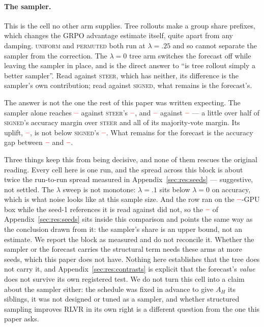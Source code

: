 \documentclass[11pt]{article}
\newcommand{\AH}{A_{H}}
\providecommand{\PENDING}{\textcolor{red}{\textbf{--}}}
\newcommand{\num}[1]{\ifcsname #1\endcsname\csname #1\endcsname\else\PENDING\fi}
\begin{document}
\paragraph{The sampler.} This is the cell no other arm supplies. Tree rollouts make a
group share prefixes, which changes the GRPO advantage estimate itself, quite apart
from any damping. \textsc{uniform} and \textsc{permuted} both run at $\lambda = .25$
and so cannot separate the sampler from the correction. The $\lambda = 0$ tree arm
switches the forecast off while leaving the sampler in place, and is the direct
answer to ``is tree rollout simply a better sampler''. Read against \textsc{steer},
which has neither, its difference is the sampler's own contribution; read against
\textsc{signed}, what remains is the forecast's.

The answer is not the one the rest of this paper was written expecting. The sampler
alone reaches $\num{Rlamzeroacc}$ against \textsc{steer}'s $\num{Rsteeracc}$, and
$\num{Rlamzeromaj}$ against $\num{Rsteermaj}$ --- a little over half of \textsc{signed}'s
accuracy margin over \textsc{steer} and all of its majority-vote margin. Its uplift, $\num{Rlamzerouplift}$, is not below \textsc{signed}'s
$\num{Rsigneduplift}$. What remains for the forecast is the accuracy gap between
$\num{Rlamzeroacc}$ and $\num{Rsignedacc}$.

Three things keep this from being decisive, and none of them rescues the original
reading. Every cell here is one run, and the spread across this block is about twice
the run-to-run spread measured in Appendix~\ref{sec:res:seeds} --- suggestive, not
settled. The $\lambda$ sweep is not monotone: $\lambda = .1$ sits below
$\lambda = 0$ on accuracy, which is what noise looks like at this sample size. And
the row ran on the $\num{Rlamzerogpus}$-GPU box while the seed-1 references it is
read against did not, so the $\num{Boxdelta}$ of Appendix~\ref{sec:res:seeds} sits
inside this comparison and points the same way as the conclusion drawn from it: the
sampler's share is an upper bound, not an estimate. We
report the block as measured and do not reconcile it. Whether the sampler or the
forecast carries the structural term needs these arms at more seeds, which this
paper does not have. Nothing here establishes that the tree does not carry it, and
Appendix~\ref{sec:res:contrasts} is explicit that the forecast's \emph{value} does
not survive its own registered test. We do not turn this cell into a claim about the
sampler either: the schedule was fixed in advance to give $\AH$ its siblings, it was
not designed or tuned as a sampler, and whether structured sampling improves RLVR
in its own right is a different question from the one this paper asks.
\end{document}
